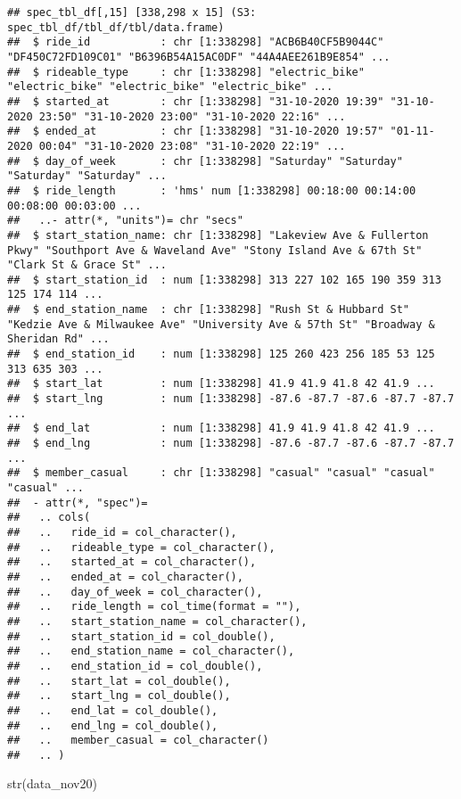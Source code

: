 \documentclass[
]{article}
\newenvironment{Shaded}{\begin{snugshade}}{\end{snugshade}}
\newcommand{\FunctionTok}[1]{\textcolor[rgb]{0.00,0.00,0.00}{#1}}
\newcommand{\NormalTok}[1]{#1}
\begin{document}
\begin{verbatim}
## spec_tbl_df[,15] [338,298 x 15] (S3: spec_tbl_df/tbl_df/tbl/data.frame)
##  $ ride_id           : chr [1:338298] "ACB6B40CF5B9044C" "DF450C72FD109C01" "B6396B54A15AC0DF" "44A4AEE261B9E854" ...
##  $ rideable_type     : chr [1:338298] "electric_bike" "electric_bike" "electric_bike" "electric_bike" ...
##  $ started_at        : chr [1:338298] "31-10-2020 19:39" "31-10-2020 23:50" "31-10-2020 23:00" "31-10-2020 22:16" ...
##  $ ended_at          : chr [1:338298] "31-10-2020 19:57" "01-11-2020 00:04" "31-10-2020 23:08" "31-10-2020 22:19" ...
##  $ day_of_week       : chr [1:338298] "Saturday" "Saturday" "Saturday" "Saturday" ...
##  $ ride_length       : 'hms' num [1:338298] 00:18:00 00:14:00 00:08:00 00:03:00 ...
##   ..- attr(*, "units")= chr "secs"
##  $ start_station_name: chr [1:338298] "Lakeview Ave & Fullerton Pkwy" "Southport Ave & Waveland Ave" "Stony Island Ave & 67th St" "Clark St & Grace St" ...
##  $ start_station_id  : num [1:338298] 313 227 102 165 190 359 313 125 174 114 ...
##  $ end_station_name  : chr [1:338298] "Rush St & Hubbard St" "Kedzie Ave & Milwaukee Ave" "University Ave & 57th St" "Broadway & Sheridan Rd" ...
##  $ end_station_id    : num [1:338298] 125 260 423 256 185 53 125 313 635 303 ...
##  $ start_lat         : num [1:338298] 41.9 41.9 41.8 42 41.9 ...
##  $ start_lng         : num [1:338298] -87.6 -87.7 -87.6 -87.7 -87.7 ...
##  $ end_lat           : num [1:338298] 41.9 41.9 41.8 42 41.9 ...
##  $ end_lng           : num [1:338298] -87.6 -87.7 -87.6 -87.7 -87.7 ...
##  $ member_casual     : chr [1:338298] "casual" "casual" "casual" "casual" ...
##  - attr(*, "spec")=
##   .. cols(
##   ..   ride_id = col_character(),
##   ..   rideable_type = col_character(),
##   ..   started_at = col_character(),
##   ..   ended_at = col_character(),
##   ..   day_of_week = col_character(),
##   ..   ride_length = col_time(format = ""),
##   ..   start_station_name = col_character(),
##   ..   start_station_id = col_double(),
##   ..   end_station_name = col_character(),
##   ..   end_station_id = col_double(),
##   ..   start_lat = col_double(),
##   ..   start_lng = col_double(),
##   ..   end_lat = col_double(),
##   ..   end_lng = col_double(),
##   ..   member_casual = col_character()
##   .. )
\end{verbatim}

\begin{Shaded}
\begin{Highlighting}[]
\FunctionTok{str}\NormalTok{(data\_nov20)}
\end{Highlighting}
\end{Shaded}
\end{document}
